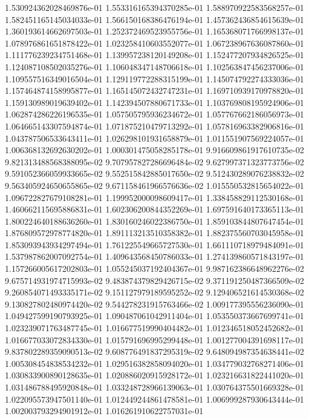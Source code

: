1.530924362028469876e-01
1.553316165394370285e-01
1.588970922583568257e-01
1.582451165145034033e-01
1.566150168386476194e-01
1.457362436854615639e-01
1.360193614662697503e-01
1.252372469523955756e-01
1.165368071766998137e-01
1.078976861651878422e-01
1.023258410603552077e-01
1.067238967636087860e-01
1.111776239234751468e-01
1.139957238120149208e-01
1.152477207934826525e-01
1.124087108502035276e-01
1.106048347148706618e-01
1.102563847456237006e-01
1.109557516349016504e-01
1.129119772288315199e-01
1.145074792274333036e-01
1.157464874158995877e-01
1.165145072432747231e-01
1.169710939170978820e-01
1.159130989019639402e-01
1.142394507880671733e-01
1.103769808195924906e-01
1.062874286226196535e-01
1.057505795936234672e-01
1.057767662186056973e-01
1.064665143307594874e-01
1.071875210479713292e-01
1.057816963382906816e-01
1.043787506533643411e-01
1.026298101931658879e-01
1.011551907569224057e-01
1.006368132692630202e-01
1.000301475058285178e-01
9.916609861917610735e-02
9.821313488568388095e-02
9.707957827286696484e-02
9.627997371323773756e-02
9.591052366059933665e-02
9.552515842885017650e-02
9.512430289076238832e-02
9.563405924650655865e-02
9.671158461966576636e-02
1.015550532815654022e-01
1.096722827679108281e-01
1.199952000098609417e-01
1.338458829112530168e-01
1.460662115695886831e-01
1.602306200844352269e-01
1.697591640173365113e-01
1.800224640188636260e-01
1.830160246022386750e-01
1.859103844807647454e-01
1.876809572978774820e-01
1.891113213510358382e-01
1.882375560703045958e-01
1.853093943934297494e-01
1.761225549665727530e-01
1.661110718979484091e-01
1.537987862007092754e-01
1.409643568450786033e-01
1.274139860571843197e-01
1.157266005617202803e-01
1.055245037192404367e-01
9.987162386648962276e-02
9.675714931974715993e-02
9.483874379829426715e-02
9.371191250487366509e-02
9.260854071493335171e-02
9.151127979189595252e-02
9.129406521614530368e-02
9.130827802480974420e-02
9.544278231915763466e-02
1.009177395556236090e-01
1.049427599190793925e-01
1.090487061042911404e-01
1.053550373667699741e-01
1.023239071763487745e-01
1.016677519990404482e-01
1.012346518052452682e-01
1.016677033072834330e-01
1.015791696995299448e-01
1.001277004391698117e-01
9.837802289359090513e-02
9.608776491837295319e-02
9.648094987354638441e-02
1.005308454838534232e-01
1.029516382858094020e-01
1.034779032768271406e-01
1.030833900890128635e-01
1.020886020915928172e-01
1.023216631822441020e-01
1.031486788495920848e-01
1.033248728966139063e-01
1.030764375501669328e-01
1.022095573947501140e-01
1.012449244861478581e-01
1.006999287930643444e-01
1.002003793294901912e-01
1.016261910622757031e-01
